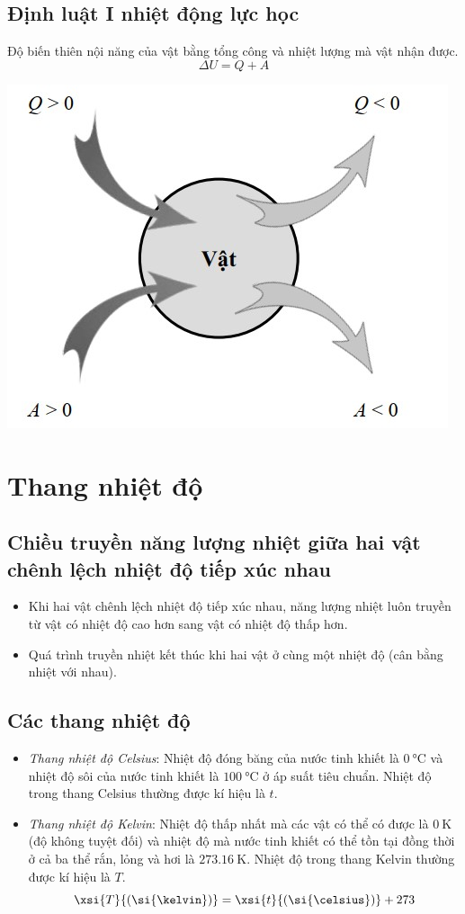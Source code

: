 \subsection{Định luật I nhiệt động lực học}
Độ biến thiên nội năng của vật bằng tổng công và nhiệt lượng mà vật nhận được.
\begin{equation}
	\Delta U=Q+A
\end{equation}
\begin{center}
	\includegraphics[width=0.3\linewidth]{../figs/G12C1-5}
\end{center}
\section{Thang nhiệt độ}
\subsection{Chiều truyền năng lượng nhiệt giữa hai vật chênh lệch nhiệt độ tiếp xúc nhau}
\begin{itemize}
	\item Khi hai vật chênh lệch nhiệt độ tiếp xúc nhau, năng lượng nhiệt luôn truyền từ vật có nhiệt độ cao hơn sang vật có nhiệt độ thấp hơn.
	\item Quá trình truyền nhiệt kết thúc khi hai vật ở cùng một nhiệt độ (cân bằng nhiệt với nhau).
\end{itemize}
\subsection{Các thang nhiệt độ}
\begin{itemize}
	\item \textit{Thang nhiệt độ Celsius}: Nhiệt độ đóng băng của nước tinh khiết là $\SI{0}{\celsius}$ và nhiệt độ sôi của nước tinh khiết là $\SI{100}{\celsius}$ ở áp suất tiêu chuẩn. Nhiệt độ trong thang Celsius thường được kí hiệu là $t$.
	\item \textit{Thang nhiệt độ Kelvin}: Nhiệt độ thấp nhất mà các vật có thể có được là $\SI{0}{\kelvin}$ (độ không tuyệt đối) và nhiệt độ mà nước tinh khiết có thể tồn tại đồng thời ở cả ba thể rắn, lỏng và hơi là $\SI{273.16}{\kelvin}$. Nhiệt độ trong thang Kelvin thường được kí hiệu là $T$.
	\begin{equation}
		\xsi{T}{\left(\si{\kelvin}\right)}=\xsi{t}{\left(\si{\celsius}\right)}+273
	\end{equation}
	
\end{itemize}
